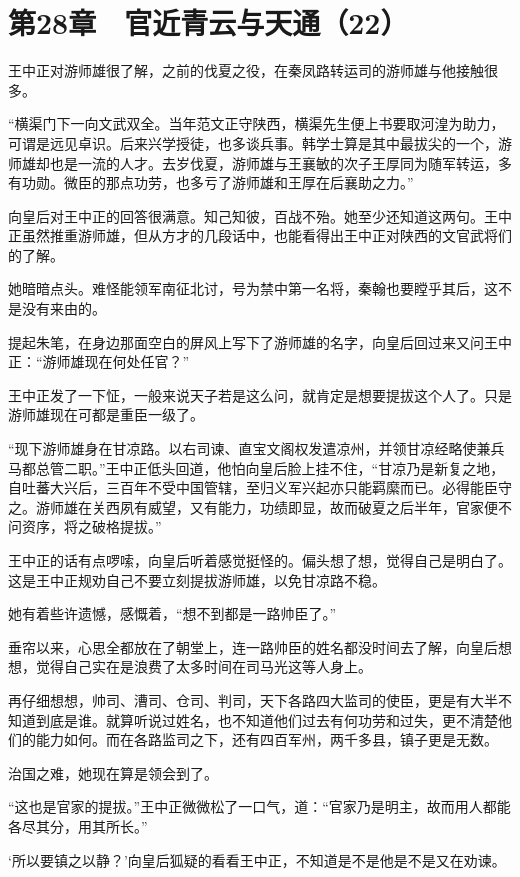 \section{第28章　官近青云与天通（22）}

王中正对游师雄很了解，之前的伐夏之役，在秦凤路转运司的游师雄与他接触很多。 

“横渠门下一向文武双全。当年范文正守陕西，横渠先生便上书要取河湟为助力，可谓是远见卓识。后来兴学授徒，也多谈兵事。韩学士算是其中最拔尖的一个，游师雄却也是一流的人才。去岁伐夏，游师雄与王襄敏的次子王厚同为随军转运，多有功勋。微臣的那点功劳，也多亏了游师雄和王厚在后襄助之力。” 

向皇后对王中正的回答很满意。知己知彼，百战不殆。她至少还知道这两句。王中正虽然推重游师雄，但从方才的几段话中，也能看得出王中正对陕西的文官武将们的了解。 

她暗暗点头。难怪能领军南征北讨，号为禁中第一名将，秦翰也要瞠乎其后，这不是没有来由的。 

提起朱笔，在身边那面空白的屏风上写下了游师雄的名字，向皇后回过来又问王中正：“游师雄现在何处任官？” 

王中正发了一下怔，一般来说天子若是这么问，就肯定是想要提拔这个人了。只是游师雄现在可都是重臣一级了。 

“现下游师雄身在甘凉路。以右司谏、直宝文阁权发遣凉州，并领甘凉经略使兼兵马都总管二职。”王中正低头回道，他怕向皇后脸上挂不住，“甘凉乃是新复之地，自吐蕃大兴后，三百年不受中国管辖，至归义军兴起亦只能羁縻而已。必得能臣守之。游师雄在关西夙有威望，又有能力，功绩即显，故而破夏之后半年，官家便不问资序，将之破格提拔。” 

王中正的话有点啰嗦，向皇后听着感觉挺怪的。偏头想了想，觉得自己是明白了。这是王中正规劝自己不要立刻提拔游师雄，以免甘凉路不稳。 

她有着些许遗憾，感慨着，“想不到都是一路帅臣了。” 

垂帘以来，心思全都放在了朝堂上，连一路帅臣的姓名都没时间去了解，向皇后想想，觉得自己实在是浪费了太多时间在司马光这等人身上。 

再仔细想想，帅司、漕司、仓司、判司，天下各路四大监司的使臣，更是有大半不知道到底是谁。就算听说过姓名，也不知道他们过去有何功劳和过失，更不清楚他们的能力如何。而在各路监司之下，还有四百军州，两千多县，镇子更是无数。 

治国之难，她现在算是领会到了。 

“这也是官家的提拔。”王中正微微松了一口气，道：“官家乃是明主，故而用人都能各尽其分，用其所长。” 

‘所以要镇之以静？’向皇后狐疑的看看王中正，不知道是不是他是不是又在劝谏。 

